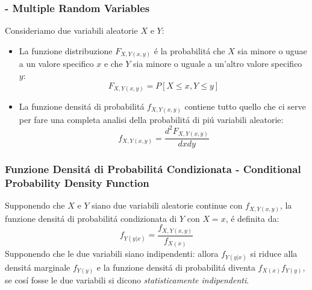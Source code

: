         \subsubsection{ - Multiple Random Variables}
            Consideriamo due variabili aleatorie $X$ e $Y$:
            \begin{itemize}
                \item {
                    La funzione distribuzione $F_{X,Y (x,y)}$ é la probabilitá che $X$ sia minore o uguae a un valore specifico $x$ e che $Y$
                    sia minore o uguale a un'altro valore specifico $y$:
                    \[
                        F_{X,Y (x,y)} = P[X\leq x,Y\leq y]    
                    \]
                }
                \item {
                    La funzione densitá di probabilitá $f_{X,Y (x,y)}$ contiene tutto quello che ci serve per fare una completa analisi della probabilitá
                    di piú variabili aleatorie:
                    \[
                        f_{X,Y (x,y)} = \frac{d^2 F_{X,Y (x,y)}}{dxdy}     
                    \]

                }
            \end{itemize}
        \subsubsection{Funzione Densitá di Probabilitá Condizionata - Conditional Probability Density Function}
            Supponendo che $X$ e $Y$ siano due variabili aleatorie continue con $f_{X,Y (x,y)}$, la funzione densitá di probabilitá condizionata di $Y$ con $X=x$,
            é definita da:
            \[
                f_{Y (y|x)} = \frac{f_{X,Y (x,y)}}{f_{X(x)}}     
            \]
            Supponendo che le due variabili siano indipendenti: allora $f_{Y (y|x)}$ si riduce alla densitá marginale $f_{Y (y)}$ e la funzione densitá di
            probabilitá diventa $f_{X (x)}f_{Y (y)}$, se cosí fosse le due variabili si dicono \emph{statisticamente indipendenti}.
